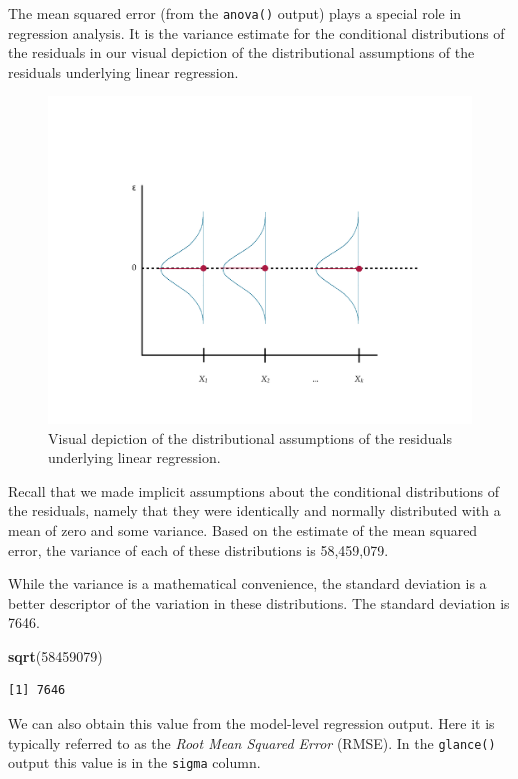 \documentclass[]{book}
\newenvironment{Shaded}{\begin{snugshade}}{\end{snugshade}}
\newcommand{\DecValTok}[1]{\textcolor[rgb]{0.00,0.00,0.81}{#1}}
\newcommand{\KeywordTok}[1]{\textcolor[rgb]{0.13,0.29,0.53}{\textbf{#1}}}
\newcommand{\NormalTok}[1]{#1}
\begin{document}
The mean squared error (from the \texttt{anova()} output) plays a special role in regression analysis. It is the variance estimate for the conditional distributions of the residuals in our visual depiction of the distributional assumptions of the residuals underlying linear regression.

\begin{figure}

{\centering \includegraphics[width=0.7\linewidth]{images/regression-assumptions-residuals} 

}

\caption{Visual depiction of the distributional assumptions of the residuals underlying linear regression.}\label{fig:unnamed-chunk-116}
\end{figure}

Recall that we made implicit assumptions about the conditional distributions of the residuals, namely that they were identically and normally distributed with a mean of zero and some variance. Based on the estimate of the mean squared error, the variance of each of these distributions is 58,459,079.

While the variance is a mathematical convenience, the standard deviation is a better descriptor of the variation in these distributions. The standard deviation is 7646.

\begin{Shaded}
\begin{Highlighting}[]
\KeywordTok{sqrt}\NormalTok{(}\DecValTok{58459079}\NormalTok{)}
\end{Highlighting}
\end{Shaded}

\begin{verbatim}
[1] 7646
\end{verbatim}

We can also obtain this value from the model-level regression output. Here it is typically referred to as the \emph{Root Mean Squared Error} (RMSE). In the \texttt{glance()} output this value is in the \texttt{sigma} column.
\end{document}
